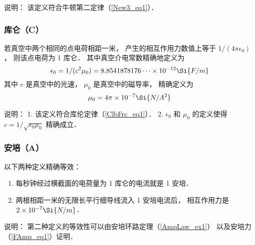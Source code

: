 说明： 该定义符合牛顿第二定律（\autoref{New3_eq1}）．

\subsubsection{库仑（C）}
若真空中两个相同的点电荷相距一米， 产生的相互作用力数值上等于 $1/(4\pi\epsilon_0)$， 则该点电荷为 1 库仑． 其中真空介电常数精确地定义为
\begin{equation}
\epsilon_0 = 1/(c^2 \mu_0) = 8.8541878176\dots \times 10^{-12} \Si{F/m}
\end{equation}
其中 $c$ 是真空中的光速， $\mu_0$ 是真空中的磁导率， 精确定义为
\begin{equation}
\mu_0 = 4\pi \times 10^{-7} \Si{N/A^2}
\end{equation}

说明： 1. 该定义符合库伦定律（\autoref{ClbFrc_eq1}）． 2. $\epsilon_0$ 和 $\mu_0$ 的定义使得 $c = 1/\sqrt{\epsilon_0 \mu_0}$ 精确成立．

\subsubsection{安培（A）}
以下两种定义精确等效：
\begin{enumerate}
\item 每秒钟经过横截面的电荷量为 1 库仑的电流就是 1 安培．
\item 两根相距一米的无限长平行细导线流入 1 安培电流后， 相互作用力是 $2 \times 10^{-7}\Si{N/m}$． 
\end{enumerate}

说明： 第二种定义的等效性可以由安培环路定理（\autoref{AmpLaw_ex1}） 以及安培力（\autoref{FAmp_eq1}）证明．
